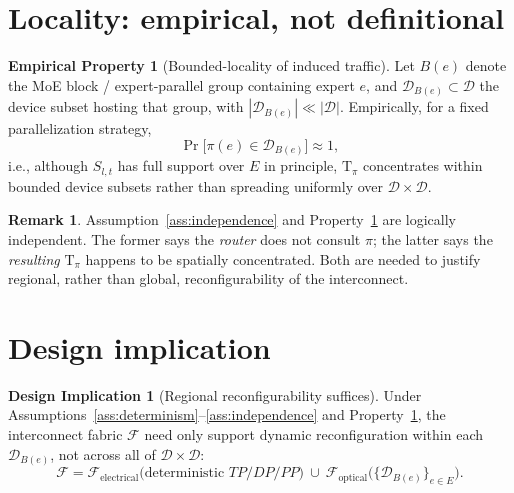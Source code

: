 \documentclass[11pt]{article}
\theoremstyle{definition}
\newtheorem{definition}{Definition}
\newtheorem{property}{Empirical Property}
\newtheorem{remark}{Remark}
\newtheorem{proposition}{Design Implication}
\newcommand{\Route}{\mathrm{R}}
\newcommand{\Place}{\mathrm{P}}
\newcommand{\Traffic}{\mathrm{T}}
\begin{document}

\section{Locality: empirical, not definitional}

\begin{property}[Bounded-locality of induced traffic]
\label{prop:locality}
Let $B(e)$ denote the MoE block / expert-parallel group containing expert $e$,
and $\mathcal{D}_{B(e)}\subset\mathcal{D}$ the device subset hosting that group,
with $|\mathcal{D}_{B(e)}|\ll|\mathcal{D}|$. Empirically, for a fixed
parallelization strategy,
\[
  \Pr\bigl[\pi(e)\in\mathcal{D}_{B(e)}\bigr]\approx 1,
\]
i.e., although $S_{l,t}$ has full support over $E$ in principle, $\Traffic_\pi$
concentrates within bounded device subsets rather than spreading uniformly
over $\mathcal{D}\times\mathcal{D}$.
\end{property}

\begin{remark}
Assumption~\ref{ass:independence} and Property~\ref{prop:locality} are
logically independent. The former says the \emph{router} does not consult
$\pi$; the latter says the \emph{resulting} $\Traffic_\pi$ happens to be
spatially concentrated. Both are needed to justify regional, rather than
global, reconfigurability of the interconnect.
\end{remark}

\section{Design implication}

\begin{proposition}[Regional reconfigurability suffices]
Under Assumptions~\ref{ass:determinism}--\ref{ass:independence} and
Property~\ref{prop:locality}, the interconnect fabric $\mathcal{F}$ need only
support dynamic reconfiguration within each $\mathcal{D}_{B(e)}$, not across
all of $\mathcal{D}\times\mathcal{D}$:
\[
  \mathcal{F} = \mathcal{F}_{\mathrm{electrical}}\bigl(\text{deterministic }TP/DP/PP\bigr)
  \ \cup\ \mathcal{F}_{\mathrm{optical}}\bigl(\{\mathcal{D}_{B(e)}\}_{e\in E}\bigr).
\]
\end{proposition}
\end{document}

